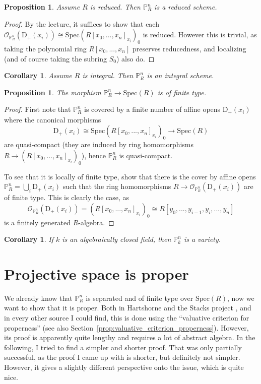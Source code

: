 \documentclass{scrartcl}
\newcommand{\D}[1]{\mathrm{D}_+(#1)}
\renewcommand{\P}{\mathbb{P}}
\newcommand{\Spec}{\mathrm{Spec}}
\renewcommand{\O}{\mathcal{O}}
\newtheorem{prop}[subsection]{Proposition}
\newtheorem{corollary}[subsection]{Corollary}
\theoremstyle{definition}
\begin{document}
\begin{prop}
    Assume $R$ is reduced.
    Then $\P_R^n$ is a reduced scheme.
\end{prop}
\begin{proof}
    By the lecture, it suffices to show that each $\O_{\P_R^n}(\D{x_i}) \cong \Spec(R[x_0, ..., x_n]_{x_i})_0$ is reduced.
    However this is trivial, as taking the polynomial ring $R[x_0, ..., x_n]$ preserves reducedness, and localizing (and of course taking the subring $S_0$) also do.
\end{proof}
\begin{corollary}
    Assume $R$ is integral.
    Then $\P_R^n$ is an integral scheme.
\end{corollary}
\begin{prop}
    \label{prop:p_quasi_compact}
    The morphism $\P_R^n \to \Spec(R)$ is of finite type.
\end{prop}
\begin{proof}
    First note that $\P_R^n$ is covered by a finite number of affine opens $\D{x_i}$ where the canonical morphisms
    \begin{equation*}
        \D{x_i} \cong \Spec(R[x_0, ..., x_n]_{x_i})_0 \to \Spec(R)
    \end{equation*}
    are quasi-compact (they are induced by ring homomorphisms $R \to (R[x_0, ..., x_n]_{x_i})_0$), hence $\P_R^n$ is quasi-compact.

    To see that it is locally of finite type, show that there is the cover by affine opens $\P_R^n = \bigcup_i \D{x_i}$ such that the ring homomorphisms $R \to \O_{\P_R^n}(\D{x_i})$ are of finite type.
    This is clearly the case, as
    \begin{equation*}
        \O_{\P_R^n}(\D{x_i}) = (R[x_0, ..., x_n]_{x_i})_0 \cong R[y_0, ..., y_{i - 1}, y_i, ..., y_n]
    \end{equation*}
    is a finitely generated $R$-algebra.
\end{proof}
\begin{corollary}
    If $k$ is an algebraically closed field, then $\P_k^n$ is a variety.
\end{corollary}

\section{Projective space is proper}
We already know that $\P_R^n$ is separated and of finite type over $\Spec(R)$, now we want to show that it is proper.
Both in Hartshorne \cite{hartshorne} and the Stacks project \cite{stacks}, and in every other source I could find, this is done using the ``valuative criterion for properness'' (see also Section~\ref{prop:valuative_criterion_properness}).
However, its proof is apparently quite lengthy and requires a lot of abstract algebra.
In the following, I tried to find a simpler and shorter proof.
That was only partially successful, as the proof I came up with is shorter, but definitely not simpler.
However, it gives a slightly different perspective onto the issue, which is quite nice.
\end{document}
